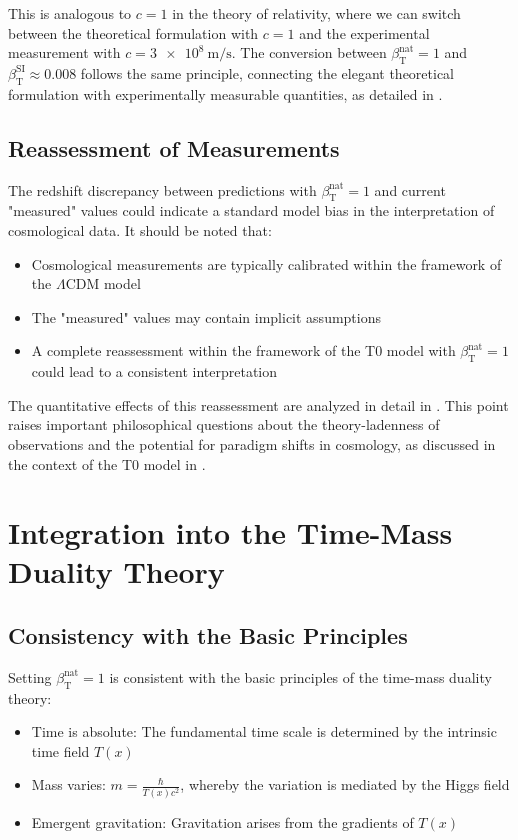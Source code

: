 \documentclass[12pt,a4paper]{article}
\newcommand{\Tfield}{T(x)}
\newcommand{\betaT}{\beta_{\text{T}}}
\begin{document}
	This is analogous to \(c = 1\) in the theory of relativity, where we can switch between the theoretical formulation with \(c = 1\) and the experimental measurement with \(c = \SI{3e8}{\meter\per\second}\). The conversion between \(\betaT^{\text{nat}} = 1\) and \(\betaT^{\text{SI}} \approx 0.008\) follows the same principle, connecting the elegant theoretical formulation with experimentally measurable quantities, as detailed in \cite{pascher_alphabeta_2025}.
	
	\subsection{Reassessment of Measurements}
	\label{subsec:reassessment}
	
	The redshift discrepancy between predictions with \(\betaT^{\text{nat}} = 1\) and current "measured" values could indicate a standard model bias in the interpretation of cosmological data. It should be noted that:
	\begin{itemize}
		\item Cosmological measurements are typically calibrated within the framework of the \(\Lambda\)CDM model
		\item The "measured" values may contain implicit assumptions
		\item A complete reassessment within the framework of the T0 model with \(\betaT^{\text{nat}} = 1\) could lead to a consistent interpretation
	\end{itemize}
	
	The quantitative effects of this reassessment are analyzed in detail in \cite{pascher_alphabeta_2025}. This point raises important philosophical questions about the theory-ladenness of observations and the potential for paradigm shifts in cosmology, as discussed in the context of the T0 model in \cite{pascher_messdifferenzen_2025}.
	
	\section{Integration into the Time-Mass Duality Theory}
	\label{sec:integration}
	
	\subsection{Consistency with the Basic Principles}
	\label{subsec:consistency_principles}
	
	Setting \(\betaT^{\text{nat}} = 1\) is consistent with the basic principles of the time-mass duality theory:
	\begin{itemize}
		\item Time is absolute: The fundamental time scale is determined by the intrinsic time field \(\Tfield\)
		\item Mass varies: \(m = \frac{\hbar}{\Tfield c^2}\), whereby the variation is mediated by the Higgs field
		\item Emergent gravitation: Gravitation arises from the gradients of \(\Tfield\)
	\end{itemize}
	
\end{document}
